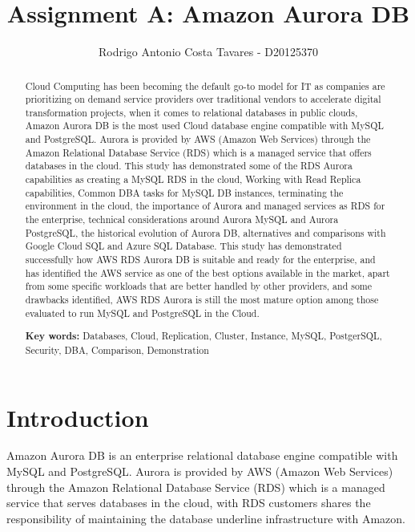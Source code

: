 \documentclass{article}
\date{\parbox{\linewidth}{\centering%
  \today\endgraf\bigskip
  Advanced Databases – TU60 2021/2022 - Brendan Tierney}}
\title  {Assignment A: Amazon Aurora DB}
\author{Rodrigo Antonio Costa Tavares - D20125370}
\begin{document}
\maketitle
\thispagestyle{empty}
\begin{abstract}

\noindent Cloud Computing has been becoming the default go-to model for IT as companies are prioritizing on demand service providers over traditional vendors to accelerate digital transformation projects, when it comes to relational databases in public clouds, Amazon Aurora DB is the most used Cloud database engine compatible with MySQL and PostgreSQL. Aurora is provided by AWS (Amazon Web Services) through the Amazon Relational Database Service (RDS) which is a managed service that offers databases in the cloud. This study has demonstrated some of the RDS Aurora capabilities as creating a MySQL RDS in the cloud, Working with Read Replica capabilities, Common DBA tasks for MySQL DB instances, terminating  the environment in the cloud, the importance of Aurora and managed services as RDS for the enterprise, technical considerations around Aurora MySQL and Aurora PostgreSQL, the historical evolution of Aurora DB, alternatives and comparisons with Google Cloud SQL and Azure SQL Database. 
This study has demonstrated successfully how AWS RDS Aurora DB is suitable and ready for the enterprise, and has identified the AWS service as one of the best options available in the market, apart from some specific workloads that are better handled by other providers, and some drawbacks identified, AWS RDS Aurora is still the most mature option among those evaluated to run MySQL and PostgreSQL in the Cloud. 

\noindent \textbf{Key words:} Databases, Cloud, Replication, Cluster, Instance, MySQL, PostgerSQL, Security, DBA, Comparison, Demonstration

\end{abstract}

\clearpage
\tableofcontents
\clearpage
\listoffigures
\clearpage

\section{Introduction}

Amazon Aurora DB is an enterprise relational database engine compatible with MySQL and PostgreSQL. Aurora is provided by AWS (Amazon Web Services) through the Amazon Relational Database Service (RDS) which is a managed service that serves databases in the cloud, with RDS customers shares the responsibility of maintaining the database underline infrastructure with Amazon\cite{todorov2013aws}.
\end{document}

